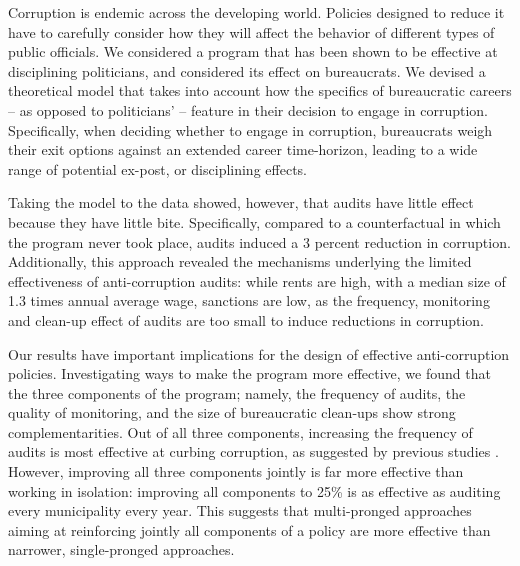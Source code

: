 \documentclass[12pt,a4paper]{article}
\theoremstyle{definition}
\begin{document}
{Corruption is endemic across the developing world. Policies designed to reduce it have to carefully consider how they will affect the behavior of different types of public officials. We considered a program that has been shown to be effective at disciplining politicians, and considered its effect on bureaucrats. We devised a theoretical model that takes into account how the specifics of bureaucratic careers -- as opposed to politicians' -- feature in their decision to engage in corruption. Specifically, when deciding whether to engage in corruption, bureaucrats weigh their exit options against an extended career time-horizon, leading to a wide range of potential ex-post, or disciplining effects. 

Taking the model to the data showed, however, that audits have little effect because they have little bite. Specifically, compared to a counterfactual in which the program never took place, audits induced a 3 percent reduction in corruption. Additionally, this approach revealed the mechanisms underlying the limited effectiveness of anti-corruption audits: while rents are high, with a median size of 1.3 times annual average wage, sanctions are low, as the frequency, monitoring and clean-up effect of audits are too small to induce reductions in corruption. 

Our results have important implications for the design of effective anti-corruption policies. Investigating ways to make the program more effective, we found that the three components of the program; namely, the frequency of audits, the quality of monitoring, and the size of bureaucratic clean-ups show strong complementarities. Out of all three components, increasing the frequency of audits is most effective at curbing corruption, as suggested by previous studies \citep{olken_monitoring_2007,bobonis2016,zamboni_audit_2018}. However, improving all three components jointly is far more effective than working in isolation: improving all components to 25\% is as effective as auditing every municipality every year. This suggests that multi-pronged approaches aiming at reinforcing jointly all components of a policy are more effective than narrower, single-pronged approaches. 

}
\end{document}
